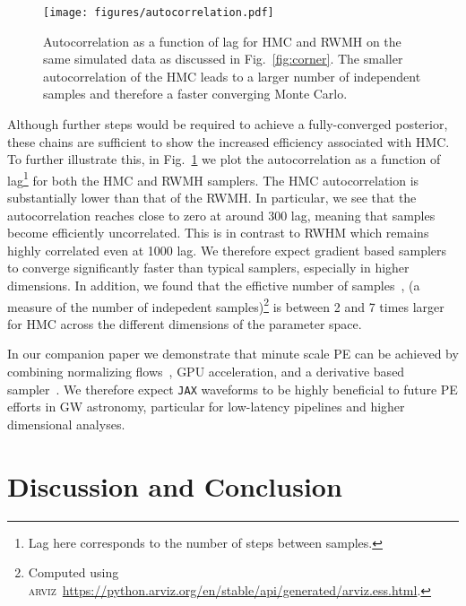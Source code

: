 \documentclass[twocolumn]{aastex631}
\newcommand{\jax}{\texttt{JAX}\xspace}
\begin{document}
\begin{figure}[t]
	\begin{centering}
		\texttt{[image: figures/autocorrelation.pdf]}
		\caption{
			Autocorrelation as a function of lag for HMC and RWMH on the same simulated data as discussed in Fig.~\ref{fig:corner}.
            The smaller autocorrelation of the HMC leads to a larger number of independent samples and therefore a faster converging Monte Carlo.
		}
		\label{fig:autocorrelation}
	\end{centering}
\end{figure}

Although further steps would be required to achieve a fully-converged posterior, these chains are sufficient to show the increased efficiency associated with HMC. 
To further illustrate this, in Fig.~\ref{fig:autocorrelation} we plot the autocorrelation as a function of lag\footnote{
    Lag here corresponds to the number of steps between samples.
} for both the HMC and RWMH samplers.
The HMC autocorrelation is substantially lower than that of the RWMH.
In particular, we see that the autocorrelation reaches close to zero at around 300 lag, meaning that samples become efficiently uncorrelated. This is in contrast to RWHM which remains highly correlated even at 1000 lag.
We therefore expect gradient based samplers to converge significantly faster than typical samplers, especially in higher dimensions.
In addition, we found that the effictive number of samples~\citep{arviz_2019}, (a measure of the number of indepedent samples)\footnote{
    Computed using \textsc{arviz}~\url{https://python.arviz.org/en/stable/api/generated/arviz.ess.html}.
    }
is between 2 and 7 times larger for HMC across the different dimensions of the parameter space.

In our companion paper we demonstrate that minute scale PE can be achieved by combining normalizing flows~\citep{2022arXiv221106397W, Gabrie:2021tlu}, GPU acceleration, and a derivative based sampler~\citep{PEpaper}. 
We therefore expect \jax waveforms to be highly beneficial to future PE efforts in GW astronomy, particular for low-latency pipelines and higher dimensional analyses.

\section{Discussion and Conclusion}
\label{subsec:discussion}
\end{document}

